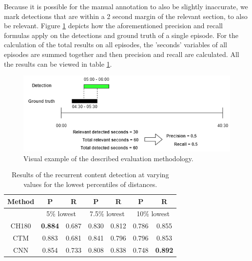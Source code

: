 \documentclass{article}
\begin{document}
Because it is possible for the manual annotation to also be slightly inaccurate, we mark detections that are within a 2 second margin of the relevant section, to also be relevant. Figure \ref{fig:evaluation-example} depicts how the aforementioned precision and recall formulas apply on the detections and ground truth of a single episode. For the calculation of the total results on all episodes, the 'seconds' variables of all episodes are summed together and then precision and recall are calculated. All the results can be viewed in table \ref{table:resultsrecurring}. 

\begin{figure}[H]
	\includegraphics[width=\textwidth]{images/evaluation.png}
	\centering
	\caption{Visual example of the described evaluation methodology.}
	\label{fig:evaluation-example}
\end{figure}

\begin{table}[h]
	\begin{center}
		\begin{tabular}{ c c c c c c c} 
			\hline
			\textbf{Method} & \textbf{P} & \textbf{R} & \textbf{P} & \textbf{R} & \textbf{P} & \textbf{R} \\
			\hline
			 & \multicolumn{2}{c}{5\% lowest} & \multicolumn{2}{c}{7.5\% lowest} & \multicolumn{2}{c}{10\% lowest} \\
			\hline
			CH180 			& \textbf{0.884} 	& 0.687		& 0.830 	& 0.812 	& 0.786	 	& 0.855 \\
			CTM 			& 0.883 	& 0.681 		& 0.841 	& 0.796 & 0.796 	& 0.853 \\
			CNN 			& 0.854		& 0.733			& 0.808		& 0.838 & 0.748		& \textbf{0.892} \\
			\hline
		\end{tabular}
	\end{center}
	\caption{Results of the recurrent content detection at varying values for the lowest percentiles of distances.}
	\label{table:resultsrecurring}
\end{table}
\end{document}
